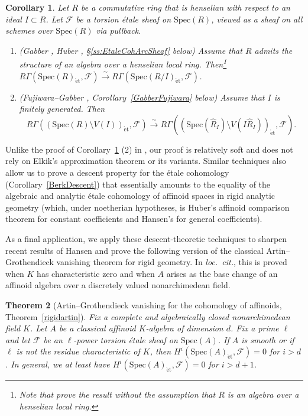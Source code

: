 \documentclass[reqno]{amsart}
\newcommand{\sF}{\mathcal{F}}
\newcommand{\spec}{\mathrm{Spec}}
\newcommand{\et}{\mathrm{\acute{e}t}}
\newtheorem{theorem}{Theorem}[section]
\newtheorem{corollary}[theorem]{Corollary}
\theoremstyle{definition}
\begin{document}
\begin{corollary}
\label{GabberLocal}
Let $R$ be a commutative ring that is henselian with respect to an ideal $I \subset R$. Let $\mathcal{F}$ be a torsion \'etale sheaf on $\spec(R)$, viewed as a sheaf on all schemes over $\spec(R)$ via pullback. 
\begin{enumerate}
\item (Gabber \cite{Gabber}, Huber \cite{Huber}, \S \ref{ss:EtaleCohArcSheaf} below) Assume that $R$ admits
the structure of an algebra
over a  
henselian local ring.  Then\footnote{Note that \cite{Gabber, Huber} prove the
result without the assumption that $R$ is an algebra over a henselian local
ring.}
$R\Gamma(\mathrm{Spec}(R)_{\et},\mathcal{F}) \xrightarrow{\sim}
R\Gamma(\mathrm{Spec}(R/I)_{\et},\mathcal{F})$.
\item (Fujiwara--Gabber \cite{Fujiwara}, Corollary~\ref{GabberFujiwara} below)  Assume that $I$ is finitely generated. Then 
\[ R \Gamma( (\spec(R) \setminus V(I))_{\et}, \mathcal{F}) \xrightarrow{\sim}  R \Gamma(
(\spec ( \hat{R}_I) \setminus V( I \hat{R}_I))_{\et},  \mathcal{F}) .\]
\end{enumerate}
\end{corollary}

Unlike the proof of Corollary~\ref{GabberLocal} (2) in \cite{Fujiwara}, our proof is relatively soft and does not rely on Elkik's approximation theorem or its variants. Similar techniques also allow us to prove a descent property for the \'etale cohomology (Corollary~\ref{BerkDescent}) that essentially amounts to the equality of the algebraic and analytic \'etale cohomology of affinoid spaces in rigid analytic geometry (which, under noetherian hypotheses, is Huber's affinoid comparison theorem \cite[Corollary 3.2.2]{HuberBook} for constant coefficients and Hansen's \cite[Theorem 1.9]{HansenArtin} for general coefficients).

As a final application, we apply these descent-theoretic techniques to sharpen
recent results of Hansen \cite{HansenArtin} and prove the following version of the
classical Artin--Grothendieck vanishing theorem for rigid geometry. 
In {\em loc.\ cit.}, this is proved when 
$K$ has characteristic zero 
and when $A$ arises as the base change of an affinoid algebra over a discretely
valued nonarchimedean field. 

\begin{theorem}[Artin--Grothendieck vanishing for the cohomology of affinoids, Theorem~\ref{rigidartin}]
\label{rigidartinintro}
Fix a complete and algebraically closed nonarchimedean field $K$. Let $A$ be a classical affinoid $K$-algebra of dimension $d$.  Fix a prime $\ell$ and let $\sF$ be an $\ell$-power torsion \'etale sheaf on $\spec(A)$. If $A$ is smooth or if $\ell$ is not the residue characteristic of $K$, then $H^i( \spec(A)_{\et}, \sF) = 0$ for $i > d$. In general, we at least have $H^i(\spec(A)_{\et},\sF) = 0$ for $i > d+1$.
\end{theorem} 
\end{document}
